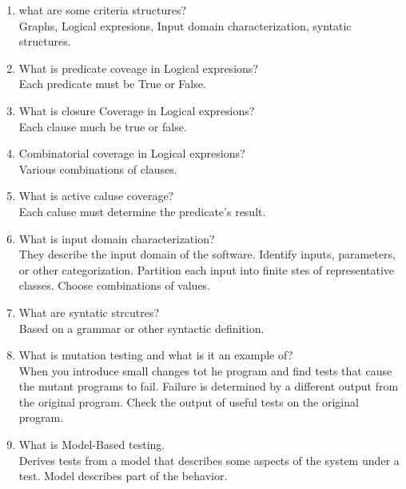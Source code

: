 \documentclass[10pt]{article}
\begin{document}
\begin{enumerate}
    \item what are some criteria structures?\\
          Graphs, Logical expresions, Input domain characterization, syntatic structures.\\

    \item What is predicate coveage in Logical expresions?\\
          Each predicate must be True or False.\\

    \item What is closure Coverage in Logical expresions?\\
          Each clause much be true or false.\\

    \item Combinatorial coverage in Logical expresions?\\
          Various combinations of clauses.\\

    \item What is active caluse coverage?\\
          Each caluse must determine the predicate's result.\\

    \item What is input domain characterization?\\
          They describe the input domain of the software. Identify inputs, parameters, or other categorization. Partition each input into finite stes of representative classes. Choose combinations of values.\\

    \item What are syntatic strcutres?\\
          Based on a grammar or other syntactic definition.

    \item What is mutation testing and what is it an example of?\\
          When you introduce small changes tot he program and find tests that cause the mutant programs to fail. Failure is determined by a different output from the original program. Check the output of useful tests on the original program.\\

    \item What is Model-Based testing.\\
          Derives tests from a model that describes some aspects of the system under a test. Model describes part of the behavior.\\


\end{enumerate}
\end{document}
